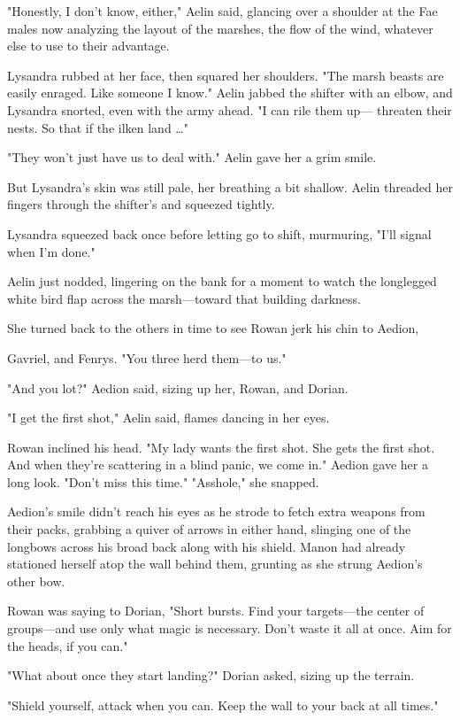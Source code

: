 "Honestly, I don't know, either," Aelin said, glancing over a shoulder at the Fae males now analyzing the layout of the marshes, the flow of the wind, whatever else to use to their advantage.

Lysandra rubbed at her face, then squared her shoulders. "The marsh beasts are easily enraged. Like someone I know." Aelin jabbed the shifter with an elbow, and Lysandra snorted, even with the army ahead. "I can rile them up--- threaten their nests. So that if the ilken land
\ldots"

"They won't just have us to deal with." Aelin gave her a grim smile.

But Lysandra's skin was still pale, her breathing a bit shallow. Aelin threaded her fingers through the shifter's and squeezed tightly.

Lysandra squeezed back once before letting go to shift, murmuring, "I'll signal when I'm done."

Aelin just nodded, lingering on the bank for a moment to watch the longlegged white bird flap across the marsh---toward that building darkness.

She turned back to the others in time to see Rowan jerk his chin to Aedion,

Gavriel, and Fenrys. "You three herd them---to us."

"And you lot?" Aedion said, sizing up her, Rowan, and Dorian.

"I get the first shot," Aelin said, flames dancing in her eyes.

Rowan inclined his head. "My lady wants the first shot. She gets the first shot. And when they're scattering in a blind panic, we come in." Aedion gave her a long look. "Don't miss this time." "Asshole," she snapped.

Aedion's smile didn't reach his eyes as he strode to fetch extra weapons from their packs, grabbing a quiver of arrows in either hand, slinging one of the longbows across his broad back along with his shield. Manon had already stationed herself atop the wall behind them, grunting as she strung Aedion's other bow.

Rowan was saying to Dorian, "Short bursts. Find your targets---the center of groups---and use only what magic is necessary. Don't waste it all at once. Aim for the heads, if you can."

"What about once they start landing?" Dorian asked, sizing up the terrain.

"Shield yourself, attack when you can. Keep the wall to your back at all times."

